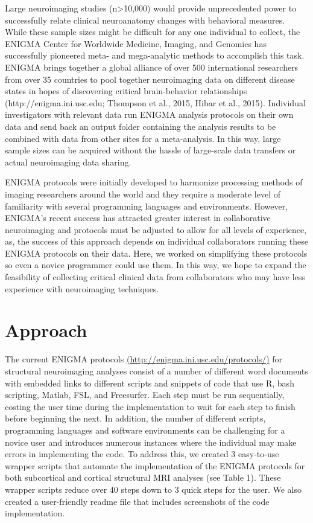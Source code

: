 \documentclass[twocolumn]{bmcart}%
\begin{document}
Large neuroimaging studies (n\textgreater{}10,000) would provide
unprecedented power to successfully relate clinical neuroanatomy changes
with behavioral measures. While these sample sizes might be difficult
for any one individual to collect, the ENIGMA Center for Worldwide
Medicine, Imaging, and Genomics has successfully pioneered meta- and
mega-analytic methods to accomplish this task. ENIGMA brings together a
global alliance of over 500 international researchers from over 35
countries to pool together neuroimaging data on different disease states
in hopes of discovering critical brain-behavior relationships
(http://enigma.ini.usc.edu; Thompson et al., 2015, Hibar et al., 2015). Individual
investigators with relevant data run ENIGMA analysis protocols on their
own data and send back an output folder containing the analysis results
to be combined with data from other sites for a meta-analysis. In this
way, large sample sizes can be acquired without the hassle of
large-scale data transfers or actual neuroimaging data sharing.

ENIGMA protocols were initially developed to harmonize processing
methods of imaging researchers around the world and they require a
moderate level of familiarity with several programming languages and
environments. However, ENIGMA's recent success has attracted greater
interest in collaborative neuroimaging and protocols must be adjusted to
allow for all levels of experience, as, the success of this approach
depends on individual collaborators running these ENIGMA protocols on
their data. Here, we worked on simplifying these protocols so even a
novice programmer could use them. In this way, we hope to expand the
feasibility of collecting critical clinical data from collaborators who
may have less experience with neuroimaging techniques.

\section{Approach}\label{approach}

The current ENIGMA protocols \url{(http://enigma.ini.usc.edu/protocols/)} for
structural neuroimaging analyses consist of a number of different word
documents with embedded links to different scripts and snippets of code
that use R, bash scripting, Matlab, FSL, and Freesurfer. Each step must
be run sequentially, costing the user time during the implementation to
wait for each step to finish before beginning the next. In addition, the
number of different scripts, programming languages and software
environments can be challenging for a novice user and introduces
numerous instances where the individual may make errors in implementing
the code. To address this, we created 3 easy-to-use wrapper scripts
that automate the implementation of the ENIGMA protocols for both
subcortical and cortical structural MRI analyses (see Table 1). These wrapper scripts
reduce over 40 steps down to 3 quick steps for the user. We also created
a user-friendly readme file that includes screenshots of the code
implementation.
\end{document}
